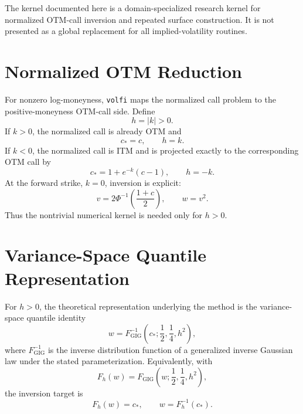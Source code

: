\documentclass[11pt]{article}
\begin{document}
	The kernel documented here is a domain-specialized research kernel for normalized OTM-call inversion and repeated surface construction. It is not presented as a global replacement for all implied-volatility routines.
	
	\section{Normalized OTM Reduction}
	
	For nonzero log-moneyness, \texttt{volfi} maps the normalized call problem to the positive-moneyness OTM-call side. Define
	\begin{equation}
		h=|k|>0.
	\end{equation}
	If $k>0$, the normalized call is already OTM and
	\begin{equation}
		c_*=c, \qquad h=k.
	\end{equation}
	If $k<0$, the normalized call is ITM and is projected exactly to the corresponding OTM call by
	\begin{equation}
		c_* = 1 + e^{-k}(c-1), \qquad h=-k.
	\end{equation}
	At the forward strike, $k=0$, inversion is explicit:
	\begin{equation}
		v = 2\Phi^{-1}\left(\frac{1+c}{2}\right), \qquad w=v^2.
	\end{equation}
	Thus the nontrivial numerical kernel is needed only for $h>0$.
	
	\section{Variance-Space Quantile Representation}
	
	For $h>0$, the theoretical representation underlying the method is the variance-space quantile identity
	\begin{equation}
		w = F_{\mathrm{GIG}}^{-1}\left(c_*;\frac12,\frac14,h^2\right),
	\end{equation}
	where $F_{\mathrm{GIG}}^{-1}$ is the inverse distribution function of a generalized inverse Gaussian law under the stated parameterization. Equivalently, with
	\begin{equation}
		F_h(w)=F_{\mathrm{GIG}}\left(w;\frac12,\frac14,h^2\right),
	\end{equation}
	the inversion target is
	\begin{equation}
		F_h(w)=c_*, \qquad w=F_h^{-1}(c_*).
	\end{equation}
	
\end{document}
